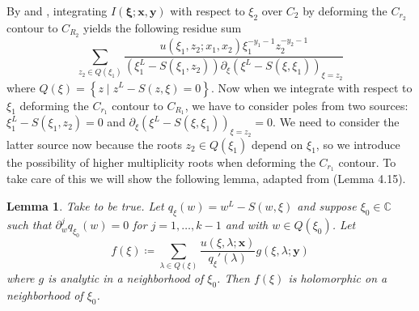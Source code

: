 \documentclass[a4paper,11pt]{article}
\newtheorem{lemma}[theorem]{Lemma}
\theoremstyle{definition}
\begin{document}
By  and , integrating $I(\boldsymbol{\xi};\textbf{x},\textbf{y})$ with respect to $\xi_2$ over $C_2$ by deforming the $C_{r_2}$ contour to $C_{R_2}$ yields the following residue sum
\begin{equation}\label{e: xi2 residue sum}
    \sum_{z_2\in Q(\xi_1)} \frac{u(\xi_1,z_2; x_1,x_2)\xi_1^{-y_1-1}z_2^{-y_2-1}}{\left(\xi_1^L-S(\xi_1,z_2)\right)\partial_{\xi}\left(\xi^L-S(\xi,\xi_1)\right)_{\xi=z_2}}
\end{equation}
where $Q(\xi)=\left\{ z  \mid z^L-S(z,\xi) = 0 \right\}$. Now when we integrate with respect to $\xi_1$ deforming the $C_{r_1}$ contour to $C_{R_1}$, we have to consider poles from two sources: $\xi_1^L-S(\xi_1,z_2)=0$ and $\partial_{\xi}\left(\xi^L-S(\xi,\xi_1)\right)_{\xi=z_2}=0$. We need to consider the latter source now because the roots $z_2\in Q(\xi_1)$ depend on $\xi_1$, so we introduce the possibility of higher multiplicity roots when deforming the $C_{r_1}$ contour. To take care of this we will show the following lemma, adapted from \cite{li_contour_2023} (Lemma 4.15). 

\begin{lemma}\label{l: double roots don't contribute}
    Take  to be true. Let $q_\xi(w)=w^L-S(w,\xi)$ and suppose $\xi_0\in \mathbb{C}$ such that $\partial_{w}^j q_{\xi_0}(w)=0$ for $j=1,\ldots,k-1$ and with $w\in Q(\xi_0)$. 
    Let 
    \begin{equation}
        f(\xi) \coloneq \sum_{\lambda\in Q(\xi)} \frac{u(\xi,\lambda;\textbf{x})}{q_\xi'(\lambda)}g(\xi,\lambda;\textbf{y})
    \end{equation}
    where $g$ is analytic in a neighborhood of $\xi_0$. Then $f(\xi)$ is holomorphic on a neighborhood of $\xi_0$. 
\end{lemma}
\end{document}
